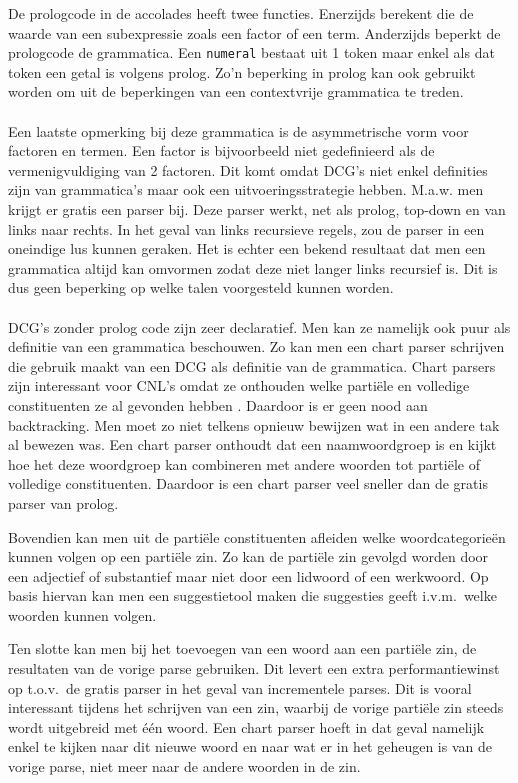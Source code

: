 De prologcode in de accolades heeft twee functies. Enerzijds berekent die de waarde van een subexpressie zoals een factor of een term. Anderzijds beperkt de prologcode de grammatica. Een \texttt{numeral} bestaat uit 1 token maar enkel als dat token een getal is volgens prolog. Zo'n beperking in prolog kan ook gebruikt worden om uit de beperkingen van een contextvrije grammatica te treden.

\paragraph{}Een laatste opmerking bij deze grammatica is de asymmetrische vorm voor factoren en termen. Een factor is bijvoorbeeld niet gedefinieerd als de vermenigvuldiging van 2 factoren. Dit komt omdat DCG's niet enkel definities zijn van grammatica's maar ook een uitvoeringsstrategie hebben. M.a.w. men krijgt er gratis een parser bij. Deze parser werkt, net als prolog, top-down en van links naar rechts. In het geval van links recursieve regels, zou de parser in een oneindige lus kunnen geraken. Het is echter een bekend resultaat dat men een grammatica altijd kan omvormen zodat deze niet langer links recursief is. Dit is dus geen beperking op welke talen voorgesteld kunnen worden.

\paragraph{} DCG's zonder prolog code zijn zeer declaratief. Men kan ze namelijk ook puur als definitie van een grammatica beschouwen. Zo kan men een chart parser schrijven die gebruik maakt van een DCG als definitie van de grammatica. Chart parsers zijn interessant voor CNL's omdat ze onthouden welke partiële en volledige constituenten ze al gevonden hebben \cite{Kuhn2008}. Daardoor is er geen nood aan backtracking. Men moet zo niet telkens opnieuw bewijzen wat in een andere tak al bewezen was. Een chart parser onthoudt dat  een naamwoordgroep is en kijkt hoe het deze woordgroep kan combineren met andere woorden tot partiële of volledige constituenten. Daardoor is een chart parser veel sneller dan de gratis parser van prolog.

Bovendien kan men uit de partiële constituenten afleiden welke woordcategorieën kunnen volgen op een partiële zin. Zo kan de partiële zin  gevolgd worden door een adjectief of substantief maar niet door een lidwoord of een werkwoord. Op basis hiervan kan men een suggestietool maken die suggesties geeft i.v.m.\ welke woorden kunnen volgen.

Ten slotte kan men bij het toevoegen van een woord aan een partiële zin, de resultaten van de vorige parse gebruiken. Dit levert een extra performantiewinst op t.o.v.\ de gratis parser in het geval van incrementele parses. Dit is vooral interessant tijdens het schrijven van een zin, waarbij de vorige partiële zin steeds wordt uitgebreid met één woord. Een chart parser hoeft in dat geval namelijk enkel te kijken naar dit nieuwe woord en naar wat er in het geheugen is van de vorige parse, niet meer naar de andere woorden in de zin.
